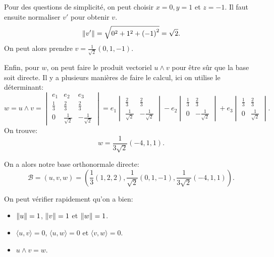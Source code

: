{\begin{td-sol}[]
		Pour des questions de simplicité, on peut choisir \(x = 0, y = 1\) et \(z = -1\).
		Il faut ensuite normaliser \(v'\) pour obtenir \(v\).
		\begin{equation*}
			\mathopen{}\left\|v'\right\|\mathclose{} = \sqrt{0^2 + 1^2 + {(-1)}^2} = \sqrt{2}.
		\end{equation*}
		On peut alors prendre \(\boxed{v = \frac{1}{\sqrt{2}}(0, 1, -1)}\).

		Enfin, pour \(w\), on peut faire le produit vectoriel \(u \wedge v\) pour être sûr que la base soit directe.
		Il y a plusieurs manières de faire le calcul, ici on utilise le déterminant:
		\begin{equation*}
			w = u \wedge v = 
			\begin{vmatrix}
				e_1 & e_2 & e_3\\
				\frac{1}{3} & \frac{2}{3} & \frac{2}{3}\\
				0 & \frac{1}{\sqrt{2}} & -\frac{1}{\sqrt{2}}
			\end{vmatrix}
			= e_1
			\begin{vmatrix}
				\frac{2}{3} & \frac{2}{3}\\
				\frac{1}{\sqrt{2}} & -\frac{1}{\sqrt{2}}
			\end{vmatrix}
			- e_2
			\begin{vmatrix}
				\frac{1}{3} & \frac{2}{3}\\
				0 & -\frac{1}{\sqrt{2}}
			\end{vmatrix}
			+ e_3
			\begin{vmatrix}
				\frac{1}{3} & \frac{2}{3}\\
				0 & \frac{1}{\sqrt{2}}
			\end{vmatrix}.
		\end{equation*}
		On trouve:
		\begin{equation*}
			\boxed{w = \frac{1}{3\sqrt{2}}(-4, 1, 1)}.
		\end{equation*}

		On a alors notre base orthonormale directe:
		\begin{equation*}
			\boxed{\mathcal B = \left(u, v, w\right) = \left(\frac{1}{3}(1, 2, 2), \frac{1}{\sqrt{2}}(0, 1, -1), \frac{1}{3\sqrt{2}}(-4, 1, 1)\right)}.
		\end{equation*}

		On peut vérifier rapidement qu'on a bien:
		\begin{itemize}
			\item \(\mathopen{}\left\|u\right\|\mathclose{} = 1\), \(\mathopen{}\left\|v\right\|\mathclose{} = 1\) et \(\mathopen{}\left\|w\right\|\mathclose{} = 1\).

			\item \(\langle u, v \rangle = 0\), \(\langle u, w \rangle = 0\) et \(\langle v, w \rangle = 0\).

			\item \(u \wedge v = w\).
		\end{itemize}
	\end{td-sol}
}{}


